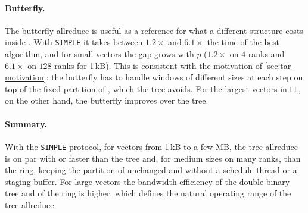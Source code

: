 \paragraph{Butterfly.}
The \bine{} butterfly allreduce is useful as a reference for what a different structure costs inside \nccl{}.
With \texttt{SIMPLE} it takes between $1.2\times$ and $6.1\times$ the time of the best \nccl{} algorithm, and for small vectors the gap grows with $p$ ($1.2\times$ on $4$ ranks and $6.1\times$ on $128$ ranks for 1\,kB).
This is consistent with the motivation of \cref{sec:tar-motivation}: the butterfly has to handle windows of different sizes at each step on top of the fixed partition of \nccl{}, which the \bine{} tree avoids.
For the largest vectors in \texttt{LL}, on the other hand, the butterfly improves over the \bine{} tree.
\paragraph{Summary.}
With the \texttt{SIMPLE} protocol, for vectors from 1\,kB to a few MB, the \bine{} tree allreduce is on par with or faster than the \nccl{} tree and, for medium sizes on many ranks, than the ring, keeping the partition of \nccl{} unchanged and without a schedule thread or a staging buffer.
For large vectors the bandwidth efficiency of the double binary tree and of the ring is higher, which defines the natural operating range of the \bine{} tree allreduce.
